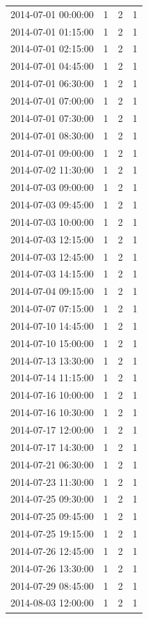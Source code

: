 \begin{tabular}{lrrr}
2014-07-01 00:00:00 & 1 & 2 & 1 \\
2014-07-01 01:15:00 & 1 & 2 & 1 \\
2014-07-01 02:15:00 & 1 & 2 & 1 \\
2014-07-01 04:45:00 & 1 & 2 & 1 \\
2014-07-01 06:30:00 & 1 & 2 & 1 \\
2014-07-01 07:00:00 & 1 & 2 & 1 \\
2014-07-01 07:30:00 & 1 & 2 & 1 \\
2014-07-01 08:30:00 & 1 & 2 & 1 \\
2014-07-01 09:00:00 & 1 & 2 & 1 \\
2014-07-02 11:30:00 & 1 & 2 & 1 \\
2014-07-03 09:00:00 & 1 & 2 & 1 \\
2014-07-03 09:45:00 & 1 & 2 & 1 \\
2014-07-03 10:00:00 & 1 & 2 & 1 \\
2014-07-03 12:15:00 & 1 & 2 & 1 \\
2014-07-03 12:45:00 & 1 & 2 & 1 \\
2014-07-03 14:15:00 & 1 & 2 & 1 \\
2014-07-04 09:15:00 & 1 & 2 & 1 \\
2014-07-07 07:15:00 & 1 & 2 & 1 \\
2014-07-10 14:45:00 & 1 & 2 & 1 \\
2014-07-10 15:00:00 & 1 & 2 & 1 \\
2014-07-13 13:30:00 & 1 & 2 & 1 \\
2014-07-14 11:15:00 & 1 & 2 & 1 \\
2014-07-16 10:00:00 & 1 & 2 & 1 \\
2014-07-16 10:30:00 & 1 & 2 & 1 \\
2014-07-17 12:00:00 & 1 & 2 & 1 \\
2014-07-17 14:30:00 & 1 & 2 & 1 \\
2014-07-21 06:30:00 & 1 & 2 & 1 \\
2014-07-23 11:30:00 & 1 & 2 & 1 \\
2014-07-25 09:30:00 & 1 & 2 & 1 \\
2014-07-25 09:45:00 & 1 & 2 & 1 \\
2014-07-25 19:15:00 & 1 & 2 & 1 \\
2014-07-26 12:45:00 & 1 & 2 & 1 \\
2014-07-26 13:30:00 & 1 & 2 & 1 \\
2014-07-29 08:45:00 & 1 & 2 & 1 \\
2014-08-03 12:00:00 & 1 & 2 & 1 \\

\end{tabular}
